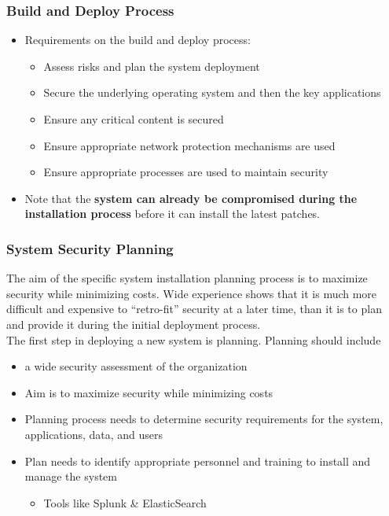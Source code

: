 \subsubsection{Build and Deploy Process}
\begin{itemize}
    \item Requirements on the build and deploy process:
    \begin{itemize}
        \item Assess risks and plan the system deployment
        \item Secure the underlying operating system and then the key applications
        \item Ensure any critical content is secured
        \item Ensure appropriate network protection mechanisms are used
        \item Ensure appropriate processes are used to maintain security
    \end{itemize}
    \item Note that the \textbf{system can already be compromised during the installation process} before it can install the latest patches.
\end{itemize}

\subsubsection{System Security Planning}
The aim of the specific system installation planning process is to maximize security while minimizing costs. Wide experience shows that it is much more
difficult and expensive to “retro-fit” security at a later time, than it is to plan and provide it during the initial deployment process.\\

The first step in deploying a new system is planning. Planning should include
\begin{itemize}
    \item a wide security assessment of the organization
    \item Aim is to maximize security while minimizing costs
    \item Planning process needs to determine security requirements for the system, applications, data, and users
    \item Plan needs to identify appropriate personnel and training to install and manage the system
    \begin{itemize}
        \item Tools like Splunk \& ElasticSearch\\
    \end{itemize}
\end{itemize}

